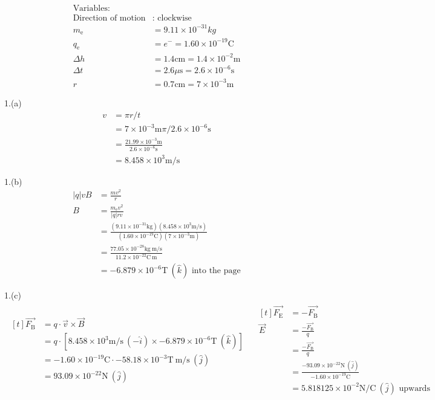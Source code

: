 \documentclass[11pt]{article}
\begin{document}
\begin{align*}
\text{Variables:} \\
\text{Direction of motion} &\text{: clockwise} \\
m_{\mathrm{e}} &= 9.11 \times 10^{-31} kg \\
q_{\mathrm{e}} &= e^- = 1.60 \times 10^{-19} \mathrm{C}\\
\Delta h &= 1.4 \mathrm{cm} = 1.4 \times 10^{-2} \mathrm{m} \\
\Delta t &= 2.6 \mu \mathrm{s} = 2.6 \times 10^{-6} \mathrm{s} \\
r &= 0.7 \mathrm{cm} = 7 \times 10^{-3} \mathrm{m}
\end{align*}

1.(a)
\begin{align*}
v &= \pi r / t \\
  &= 7 \times 10^{-3} \mathrm{m} \pi / 2.6 \times 10^{-6} \mathrm{s} \\
  &= \frac{21.99 \times 10^{-3} \mathrm{m}}{2.6 \times 10^{-6} \mathrm{s}} \\
  &= 8.458 \times 10^3 \mathrm{m / s}
\end{align*}

1.(b)
\begin{align*}
|q|vB &= \frac{mv^2}{r} \\
B &= \frac{m_{\mathrm{e}}v^2}{|q|rv} \\
  &= \frac{(9.11 \times 10^{-31} \mathrm{kg}) (8.458 \times 10^3 \mathrm{m / s})}{(1.60 \times 10^{-19} \mathrm{C}) (7 \times 10^{-3} \mathrm{m})} \\
  &= \frac{77.05 \times 10^{-28} \mathrm{kg \ m / s}}{11.2 \times 10^{-22} \mathrm{C\ m}} \\
  &= - 6.879 \times 10^{-6} \mathrm{T} \ (\hat{k}) \text{ into the page}
\end{align*}


1.(c)
\begin{align*}
\begin{aligned}[t]
\overrightarrow{F_{\mathrm{B}}} &= q \cdot \overrightarrow{v} \times \overrightarrow{B} \\
  &= q\cdot [8.458 \times 10^3 \mathrm{m/s} \ (-\hat{i}) \times - 6.879 \times 10^{-6} \mathrm{T} \ (\hat{k})] \\
  &= - 1.60 \times 10^{-19} \mathrm{C} \cdot - 58.18 \times 10^{-3} \mathrm{T\ m/s} \ (\hat{j}) \\
  &= 93.09 \times 10^{-22} \mathrm{N} \ (\hat{j})
\end{aligned}
\quad
\begin{aligned}[t]
\overrightarrow{F_{\mathrm{E}}} &= - \overrightarrow{F_{\mathrm{B}}} \\
\overrightarrow{E} &= \frac{- \overrightarrow{F_{\mathrm{B}}}}{q} \\
  &= \frac{- \overrightarrow{F_{\mathrm{B}}}}{q} \\
  &= \frac{- 93.09 \times 10^{-22} \mathrm{N} \ (\hat{j})}{- 1.60 \times 10^{-19} \mathrm{C}} \\
  &= 5.818125 \times 10^{-2} \mathrm{N/C} \ ({\hat{j}}) \text{ upwards}
\end{aligned}
\end{align*}
\end{document}
